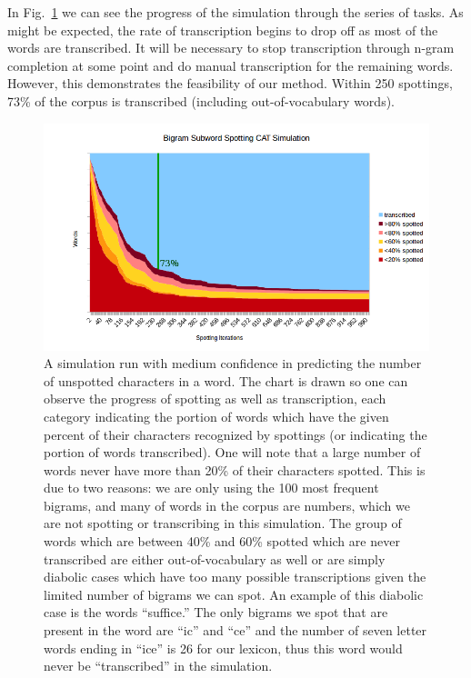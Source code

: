 \documentclass[ms]{byuprop}
\begin{document}
In Fig.~\ref{fig:fullSim} we can see the progress of the simulation through the series of tasks. As might be expected, the rate of transcription begins to drop off as most of the words are transcribed. It will be necessary to stop transcription through n-gram completion at some point and do manual transcription for the remaining words. However, this demonstrates the feasibility of our method. Within 250 spottings, 73\% of the corpus is transcribed (including out-of-vocabulary words).

\begin{figure}
    \centering
    \includegraphics[width=1.0\textwidth]{simulationGraph_big_line}
    \caption{A simulation run with medium confidence in predicting the number of unspotted characters in a word. The chart is drawn so one can observe the progress of spotting as well as transcription, each category indicating the portion of words which have the given percent of their characters recognized by spottings (or indicating the portion of words transcribed). One will note that a large number of words never have more than 20\% of their characters spotted. This is due to two reasons: we are only using the 100 most frequent bigrams, and many of words in the corpus are numbers, which we are not spotting or transcribing in this simulation. The group of words which are between 40\% and 60\% spotted which are never transcribed are either out-of-vocabulary as well or are simply diabolic cases which have too many possible transcriptions given the limited number of bigrams we can spot. An example of this diabolic case is the words ``suffice.'' The only bigrams we spot that are present in the word are ``ic'' and ``ce'' and the number of seven letter words ending in ``ice'' is 26 for our lexicon, thus this word would never be ``transcribed'' in the simulation.}
    \label{fig:fullSim}
\end{figure}
\end{document}
